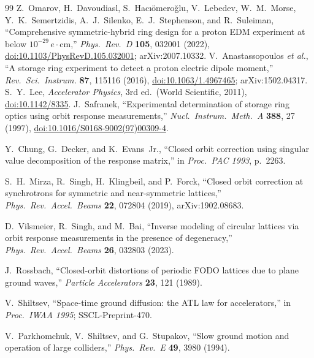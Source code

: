 \documentclass[twocolumn,a4paper,10pt]{article}
\begin{document}
\begin{thebibliography}{99}
Z.~Omarov, H.~Davoudiasl, S.~Hac\i{}\"omero\u{g}lu, V.~Lebedev, W.~M.~Morse,
Y.~K.~Semertzidis, A.~J.~Silenko, E.~J.~Stephenson, and R.~Suleiman,
``Comprehensive symmetric-hybrid ring design for a proton EDM experiment at
below $10^{-29}\,e\cdot$cm,'' \emph{Phys.\ Rev.\ D} \textbf{105}, 032001
(2022),
\href{https://doi.org/10.1103/PhysRevD.105.032001}{doi:10.1103/PhysRevD.105.032001};
arXiv:2007.10332.
V.~Anastassopoulos \emph{et al.}, ``A storage ring experiment to detect a
proton electric dipole moment,'' \emph{Rev.\ Sci.\ Instrum.} \textbf{87},
115116 (2016),
\href{https://doi.org/10.1063/1.4967465}{doi:10.1063/1.4967465};
arXiv:1502.04317.
S.~Y.~Lee, \emph{Accelerator Physics}, 3rd ed.\ (World Scientific, 2011),
\href{https://doi.org/10.1142/8335}{doi:10.1142/8335}.
J.~Safranek, ``Experimental determination of storage ring optics using orbit
response measurements,'' \emph{Nucl.\ Instrum.\ Meth.\ A} \textbf{388}, 27
(1997),
\href{https://doi.org/10.1016/S0168-9002(97)00309-4}{doi:10.1016/S0168-9002(97)00309-4}.

Y.~Chung, G.~Decker, and K.~Evans~Jr., ``Closed orbit correction using singular
value decomposition of the response matrix,'' in \emph{Proc.\ PAC 1993}, p.~2263.

S.~H.~Mirza, R.~Singh, H.~Klingbeil, and P.~Forck, ``Closed orbit correction at
synchrotrons for symmetric and near-symmetric lattices,'' \emph{Phys.\ Rev.\
Accel.\ Beams} \textbf{22}, 072804 (2019), arXiv:1902.08683.

D.~Vilsmeier, R.~Singh, and M.~Bai, ``Inverse modeling of circular lattices via
orbit response measurements in the presence of degeneracy,'' \emph{Phys.\ Rev.\
Accel.\ Beams} \textbf{26}, 032803 (2023).

J.~Rossbach, ``Closed-orbit distortions of periodic FODO lattices due to plane
ground waves,'' \emph{Particle Accelerators} \textbf{23}, 121 (1989).

\bibitem{shiltsev1995}
V.~Shiltsev, ``Space-time ground diffusion: the ATL law for accelerators,'' in
\emph{Proc.\ IWAA 1995}; SSCL-Preprint-470.

V.~Parkhomchuk, V.~Shiltsev, and G.~Stupakov, ``Slow ground motion and operation
of large colliders,'' \emph{Phys.\ Rev.\ E} \textbf{49}, 3980 (1994).


\end{thebibliography}
\end{document}

